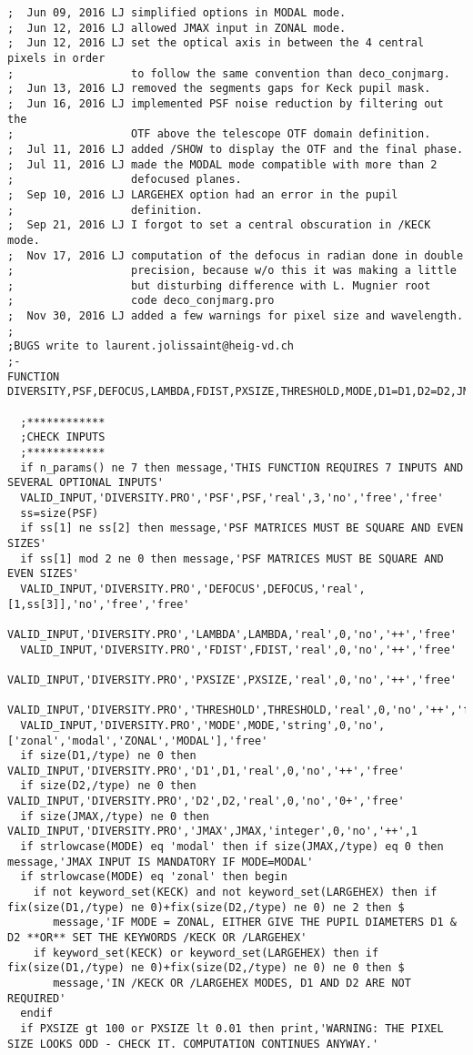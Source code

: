\begin{lstlisting}
;  Jun 09, 2016 LJ simplified options in MODAL mode.
;  Jun 12, 2016 LJ allowed JMAX input in ZONAL mode.
;  Jun 12, 2016 LJ set the optical axis in between the 4 central pixels in order 
;                  to follow the same convention than deco_conjmarg.
;  Jun 13, 2016 LJ removed the segments gaps for Keck pupil mask.
;  Jun 16, 2016 LJ implemented PSF noise reduction by filtering out the
;                  OTF above the telescope OTF domain definition.
;  Jul 11, 2016 LJ added /SHOW to display the OTF and the final phase.
;  Jul 11, 2016 LJ made the MODAL mode compatible with more than 2
;                  defocused planes.
;  Sep 10, 2016 LJ LARGEHEX option had an error in the pupil
;                  definition.
;  Sep 21, 2016 LJ I forgot to set a central obscuration in /KECK mode.
;  Nov 17, 2016 LJ computation of the defocus in radian done in double
;                  precision, because w/o this it was making a little
;                  but disturbing difference with L. Mugnier root
;                  code deco_conjmarg.pro
;  Nov 30, 2016 LJ added a few warnings for pixel size and wavelength.
;
;BUGS write to laurent.jolissaint@heig-vd.ch
;-
FUNCTION DIVERSITY,PSF,DEFOCUS,LAMBDA,FDIST,PXSIZE,THRESHOLD,MODE,D1=D1,D2=D2,JMAX=JMAX,KECK=KECK,LARGEHEX=LARGEHEX,SHOW=SHOW

  ;************
  ;CHECK INPUTS
  ;************
  if n_params() ne 7 then message,'THIS FUNCTION REQUIRES 7 INPUTS AND SEVERAL OPTIONAL INPUTS'
  VALID_INPUT,'DIVERSITY.PRO','PSF',PSF,'real',3,'no','free','free'
  ss=size(PSF)
  if ss[1] ne ss[2] then message,'PSF MATRICES MUST BE SQUARE AND EVEN SIZES'
  if ss[1] mod 2 ne 0 then message,'PSF MATRICES MUST BE SQUARE AND EVEN SIZES'
  VALID_INPUT,'DIVERSITY.PRO','DEFOCUS',DEFOCUS,'real',[1,ss[3]],'no','free','free'
  VALID_INPUT,'DIVERSITY.PRO','LAMBDA',LAMBDA,'real',0,'no','++','free'
  VALID_INPUT,'DIVERSITY.PRO','FDIST',FDIST,'real',0,'no','++','free'
  VALID_INPUT,'DIVERSITY.PRO','PXSIZE',PXSIZE,'real',0,'no','++','free'
  VALID_INPUT,'DIVERSITY.PRO','THRESHOLD',THRESHOLD,'real',0,'no','++','free'
  VALID_INPUT,'DIVERSITY.PRO','MODE',MODE,'string',0,'no',['zonal','modal','ZONAL','MODAL'],'free'
  if size(D1,/type) ne 0 then VALID_INPUT,'DIVERSITY.PRO','D1',D1,'real',0,'no','++','free'
  if size(D2,/type) ne 0 then VALID_INPUT,'DIVERSITY.PRO','D2',D2,'real',0,'no','0+','free'
  if size(JMAX,/type) ne 0 then VALID_INPUT,'DIVERSITY.PRO','JMAX',JMAX,'integer',0,'no','++',1
  if strlowcase(MODE) eq 'modal' then if size(JMAX,/type) eq 0 then message,'JMAX INPUT IS MANDATORY IF MODE=MODAL'
  if strlowcase(MODE) eq 'zonal' then begin
    if not keyword_set(KECK) and not keyword_set(LARGEHEX) then if fix(size(D1,/type) ne 0)+fix(size(D2,/type) ne 0) ne 2 then $
       message,'IF MODE = ZONAL, EITHER GIVE THE PUPIL DIAMETERS D1 & D2 **OR** SET THE KEYWORDS /KECK OR /LARGEHEX'
    if keyword_set(KECK) or keyword_set(LARGEHEX) then if fix(size(D1,/type) ne 0)+fix(size(D2,/type) ne 0) ne 0 then $
       message,'IN /KECK OR /LARGEHEX MODES, D1 AND D2 ARE NOT REQUIRED'
  endif
  if PXSIZE gt 100 or PXSIZE lt 0.01 then print,'WARNING: THE PIXEL SIZE LOOKS ODD - CHECK IT. COMPUTATION CONTINUES ANYWAY.'


\end{lstlisting}
